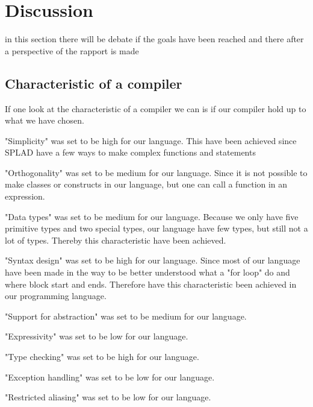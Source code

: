 \section{Discussion}
in this section there will be debate if the goals have been reached and there after a perspective of the rapport is made

\subsection{Characteristic of a compiler}
If one look at the characteristic of a compiler we can is if our compiler hold up to what we have chosen.

"Simplicity" was set to be high for our language. This have been achieved since SPLAD have a few ways to make complex functions and statements


"Orthogonality" was set to be medium for our language. Since it is  not possible to make classes or constructs in our language, but one can call a function in an expression.

"Data types" was set to be medium for our language. Because we only have five primitive types and two special types, our language have few types, but still not a lot of types. Thereby this characteristic  have been achieved.

"Syntax design" was set to be high for our language. Since most of our language have been made in the way to be better understood what a "for loop" do and where block start and ends. Therefore have this characteristic  been achieved in our programming language.

"Support for abstraction" was set to be medium for our language. 

"Expressivity" was set to be low for our language.

"Type checking" was set to be high for our language.

"Exception handling" was set to be low for our language.

"Restricted aliasing" was set to be low for our language.

